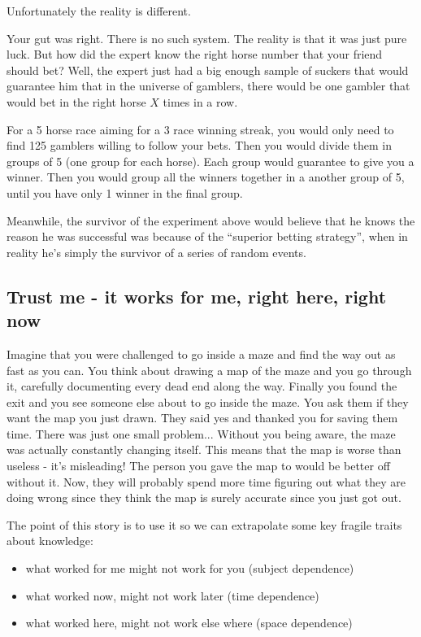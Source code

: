 \documentclass{article}
\begin{document}
Unfortunately the reality is different.

Your gut was right. There is no such system. The reality is that it was just pure luck. 
But how did the expert know the right horse number that your friend should bet? 
Well, the expert just had a big enough sample of suckers that would guarantee him that in the universe of gamblers, there would be one gambler that would bet in the right horse $X$ times in a row. 

For a 5 horse race aiming for a 3 race winning streak, you would only need to find 125 gamblers willing to follow your bets. Then you would divide them in groups of 5 (one group for each horse). Each group would guarantee to give you a winner. Then you would group all the winners together in a another group of 5, until you have only 1 winner in the final group.

Meanwhile, the survivor of the experiment above would believe that he knows the reason he was successful was because of the ``superior betting strategy'', when in reality he's simply the survivor of a series of random events.

\subsection{Trust me - it works for me, right here, right now}

Imagine that you were challenged to go inside a maze and find the way out as fast as you can. You think about drawing a map of the maze and you go through it, carefully documenting every dead end along the way. Finally you found the exit and you see someone else about to go inside the maze. You ask them if they want the map you just drawn. They said yes and thanked you for saving them time. There was just one small problem... Without you being aware, the maze was actually constantly changing itself. This means that the map is worse than useless - it's misleading! The person you gave the map to would be better off without it. Now, they will probably spend more time figuring out what they are doing wrong since they think the map is surely accurate since you just got out.

The point of this story is to use it so we can extrapolate some key fragile traits about knowledge: 
\begin{itemize}
	\item what worked for me might not work for you (subject dependence)
	\item  what worked now, might not work later (time dependence)
	\item  what worked here, might not work else where (space dependence)
\end{itemize}
\end{document}
